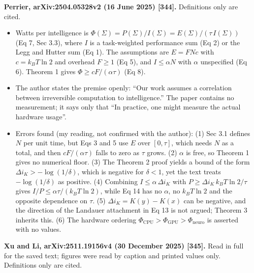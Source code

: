 \documentclass[
  10pt,
]{article}
\providecommand{\tightlist}{%
  \setlength{\itemsep}{0pt}\setlength{\parskip}{0pt}}
\begin{document}
\textbf{Perrier, arXiv:2504.05328v2 (16 June 2025) {[}344{]}.}
Definitions only are cited.

\begin{itemize}
\tightlist
\item
  Watts per intelligence is
  \(\Phi(\Sigma) = P(\Sigma)/I(\Sigma) = E(\Sigma)/(\tau\, I(\Sigma))\)
  (Eq 7, Sec 3.3), where \(I\) is a task-weighted performance sum (Eq 2)
  or the Legg and Hutter sum (Eq 1). The assumptions are \(E = F N c\)
  with \(c = k_B T\ln 2\) and overhead \(F \ge 1\) (Eq 5), and
  \(I \le \alpha N\) with \(\alpha\) unspecified (Eq 6). Theorem 1 gives
  \(\Phi \ge cF/(\alpha\tau)\) (Eq 8).
\item
  The author states the premise openly: ``Our work assumes a correlation
  between irreversible computation to intelligence.'' The paper contains
  no measurement; it says only that ``In practice, one might measure the
  actual hardware usage''.
\item
  Errors found (my reading, not confirmed with the author): (1) Sec 3.1
  defines \(N\) per unit time, but Eqs 3 and 5 use \(E\) over
  \([0,\tau]\), which needs \(N\) as a total, and then
  \(cF/(\alpha\tau)\) falls to zero as \(\tau\) grows. (2) \(\alpha\) is
  free, so Theorem 1 gives no numerical floor. (3) The Theorem 2 proof
  yields a bound of the form \(\Delta i_K > -\log(1/\delta)\), which is
  negative for \(\delta < 1\), yet the text treats \(-\log(1/\delta)\)
  as positive. (4) Combining \(I \le \alpha\,\Delta i_K\) with
  \(P \ge \Delta i_K\, k_B T\ln 2/\tau\) gives
  \(I/P \le \alpha\tau/(k_B T\ln 2)\), while Eq 14 has no \(\alpha\), no
  \(k_B T\ln 2\) and the opposite dependence on \(\tau\). (5)
  \(\Delta i_K = K(y) - K(x)\) can be negative, and the direction of the
  Landauer attachment in Eq 13 is not argued; Theorem 3 inherits this.
  (6) The hardware ordering
  \(\Phi_{\mathrm{CPU}} > \Phi_{\mathrm{GPU}} > \Phi_{\mathrm{neuro}}\)
  is asserted with no values.
\end{itemize}

\textbf{Xu and Li, arXiv:2511.19156v4 (30 December 2025) {[}345{]}.}
Read in full for the saved text; figures were read by caption and
printed values only. Definitions only are cited.
\end{document}
